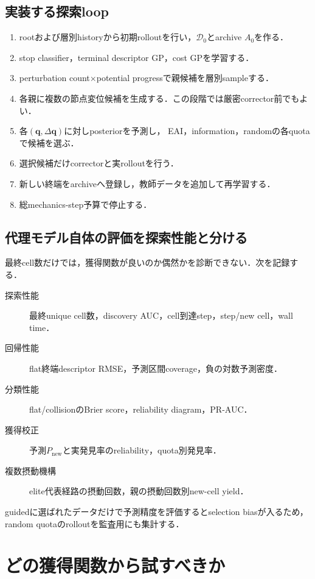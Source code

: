 \documentclass[a4paper,11pt]{ltjsarticle}
\newcommand{\D}{\mathcal D}
\begin{document}
\subsection{実装する探索loop}

\begin{enumerate}
  \item rootおよび層別historyから初期rolloutを行い，\(\D_0\)とarchive \(A_0\)を作る．
  \item stop classifier，terminal descriptor GP，cost GPを学習する．
  \item perturbation count\(\times\)potential progressで親候補を層別sampleする．
  \item 各親に複数の節点変位候補を生成する．この段階では厳密corrector前でもよい．
  \item 各\((\bm q,\Delta\bm q)\)に対しposteriorを予測し，
  EAI，information，randomの各quotaで候補を選ぶ．
  \item 選択候補だけcorrectorと実rolloutを行う．
  \item 新しい終端をarchiveへ登録し，教師データを追加して再学習する．
  \item 総mechanics-step予算で停止する．
\end{enumerate}

\subsection{代理モデル自体の評価を探索性能と分ける}

最終cell数だけでは，獲得関数が良いのか偶然かを診断できない．次を記録する．
\begin{description}
  \item[探索性能] 最終unique cell数，discovery AUC，cell到達step，step/new cell，wall time．
  \item[回帰性能] flat終端descriptor RMSE，予測区間coverage，負の対数予測密度．
  \item[分類性能] flat/collisionのBrier score，reliability diagram，PR-AUC．
  \item[獲得校正] 予測\(P_{\mathrm{new}}\)と実発見率のreliability，quota別発見率．
  \item[複数摂動機構] elite代表経路の摂動回数，親の摂動回数別new-cell yield．
\end{description}
guidedに選ばれたデータだけで予測精度を評価するとselection biasが入るため，
random quotaのrolloutを監査用にも集計する．

\section{どの獲得関数から試すべきか}
\label{sec:recommendation}
\end{document}
